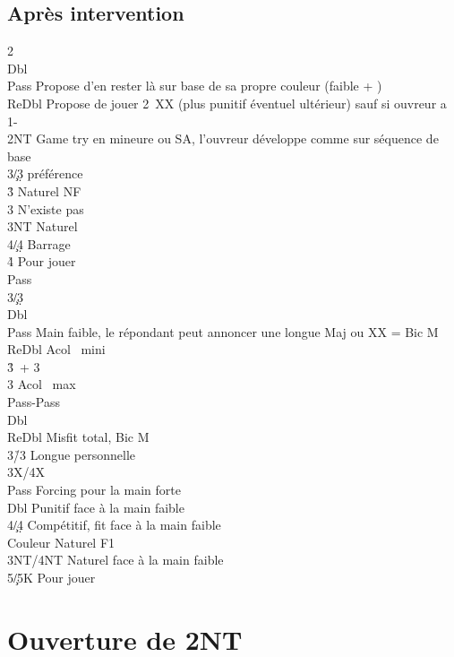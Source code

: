 \documentclass[a4paper]{article}
\begin{document}
\subsection{Après intervention}

\begin{bidtable}
2\s\+\\
Dbl\+\\
Pass \> Propose d'en rester là sur base de sa propre couleur (faible + \s )\\
ReDbl \> Propose de jouer 2\s\ XX (plus punitif éventuel ultérieur) sauf si ouvreur a 1- \s \\
2NT \> Game try en mineure ou SA, l'ouvreur développe comme sur séquence de base\\
3\c/3\d \> préférence\\
3\h \> Naturel NF\\
3\s \> N'existe pas\\
3NT \> Naturel\\
4\c/4\d \> Barrage\\
4\h \> Pour jouer\-\\
Pass\+\\
3\c/3\d\+\\
Dbl\+\\
Pass \> Main faible, le répondant peut annoncer une longue Maj ou XX = Bic M\\
ReDbl \> Acol \s\ mini\\
3\h {}\s\ + 3\h \\
3\s \> Acol \s\ max\-\\
Pass-Pass\+\\
Dbl\+\\
ReDbl \> Misfit total, Bic M\\
3\h/3\s \> Longue personnelle\-\-\-\-\\
3X/4X\+\\
Pass \> Forcing pour la main forte\\
Dbl \> Punitif face à la main faible\\
4\c/4\d \> Compétitif, fit face à la main faible\\
Couleur \> Naturel F1\\
3NT/4NT \> Naturel face à la main faible\\
5\c/5K \> Pour jouer\-\-
\end{bidtable}

\section{Ouverture de 2NT}
\end{document}
